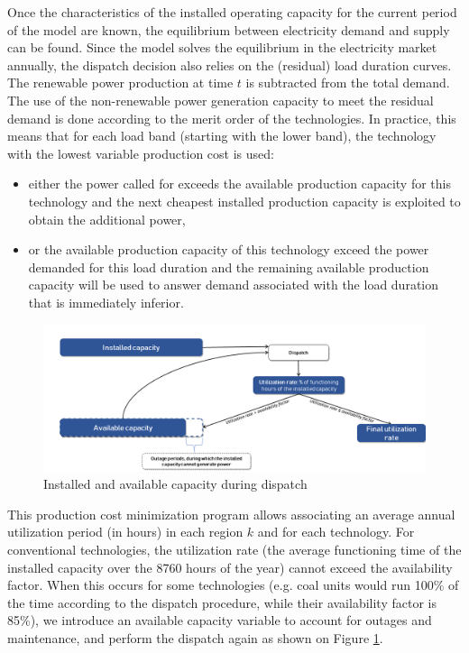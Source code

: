Once the characteristics of the installed operating capacity for the current period of the model are known, the equilibrium between electricity demand and supply can be found.
Since the model solves the equilibrium in the electricity market annually, the dispatch decision also relies on the (residual) load duration curves. The renewable power production at time $t$ is subtracted from the total demand.
The use of the non-renewable power generation capacity to meet the residual demand is done according to the merit order of the technologies.
In practice, this means that for each load band (starting with the lower band), the technology with the lowest variable production cost is used:

\begin{itemize}
    \item either the power called for exceeds the available production capacity for this technology and the next cheapest installed production capacity is exploited to obtain the additional power,
    \item or the available production capacity of this technology exceed the power demanded for this load duration and the remaining available production capacity will be used to answer demand associated with the load duration that is immediately inferior.
\end{itemize}

\begin{figure}[H]
    \centerline{\includegraphics[scale=0.4]{figures&tables/availb.png}}
    \caption{Installed and available capacity during dispatch}
    \label{fig:avail}
\end{figure}


This production cost minimization program allows associating an average annual utilization period (in hours) in each region $k$ and for each technology. For conventional technologies, the utilization rate (the average functioning time of the installed capacity over the 8760 hours of the year) cannot exceed the availability factor. When this occurs for some technologies (e.g. coal units would run 100\% of the time according to the dispatch procedure, while their availability factor is 85\%), we introduce an available capacity variable to account for outages and maintenance, and perform the dispatch again as shown on Figure \ref{fig:avail}.

